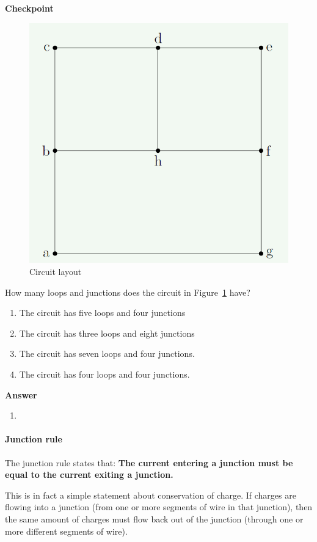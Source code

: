 \begin{framed}
\textbf{Checkpoint}\\
\begin{figure}[!htbp]
\centering
\includegraphics[width=0.5\linewidth]{files/7loop-7d21110540d72f12bf874c92522b5941.png}
\caption[]{Circuit layout}
\label{fig:circuits:7loop}
\end{figure}

How many loops and junctions does the circuit in Figure~\ref{fig:circuits:7loop} have?

\begin{enumerate}
\item The circuit has five loops and four junctions
\item The circuit has three loops and eight junctions
\item The circuit has seven loops and four junctions.
\item The circuit has four loops and four junctions.
\end{enumerate}

\begin{framed}
\textbf{Answer}\\
\begin{enumerate}[resume]
\item
\end{enumerate}
\end{framed}
\end{framed}

\paragraph{Junction rule}

The junction rule states that: \textbf{The current entering a junction must be equal to the current exiting a junction.}

This is in fact a simple statement about conservation of charge. If charges are flowing into a junction (from one or more segments of wire in that junction), then the same amount of charges must flow back out of the junction (through one or more different segments of wire).

